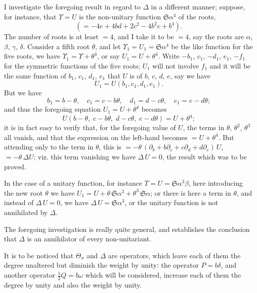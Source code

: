\documentclass[11pt,a4paper]{book}
\begin{document}
{{{\setcounter{art}{23}
\begin{art}
I investigate the foregoing result in regard to $\Delta$ in a different manner; suppose, for instance, that $\Upsilon = U$ is the non-unitary function $\mathfrak{S}\alpha^{4}$ of the roots,
\[
(= -4e + 4bd + 2c^{2} - 4b^{2}c + b^{4}).
\]
The number of roots is at least $= 4$, and I take it to be $= 4$, say the roots are $\alpha$, $\beta$, $\gamma$, $\delta$. Consider a fifth root $\theta$, and let $\Upsilon_{1} = U_{1} = \mathfrak{S}\alpha^{4}$ be the like function for the five roots, we have $\Upsilon_{1} = \Upsilon + \theta^{4}$, or say $U_{1} = U + \theta^{4}$. Write $-b_{1}$, $c_{1}$, $-d_{1}$, $e_{1}$, $-f_{1}$ for the symmetric functions of the five roots; $U_{1}$ will not involve $f_{1}$ and it will be the same function of $b_{1}$, $c_{1}$, $d_{1}$, $e_{1}$ that $U$ is of $b$, $c$, $d$, $e$, say we have
\[
U_{1} = U(b_{1}, c_{1}, d_{1}, e_{1}).
\]
But we have
\[
b_{1} = b - \theta,\quad c_{1} = c - b\theta,\quad d_{1} = d - c\theta,\quad e_{1} = e - d\theta;
\]
and thus the foregoing equation $U_{1} = U + \theta^{4}$ becomes
\[
U(b - \theta,\; c - b\theta,\; d - c\theta,\; e - d\theta) = U + \theta^{4};
\]
it is in fact easy to verify that, for the foregoing value of $U$, the terms in $\theta$, $\theta^{2}$, $\theta^{3}$ all vanish, and that the expression on the left-hand becomes $= U + \theta^{4}$. But attending only to the term in $\theta$, this is $= -\theta\,(\partial_{b} + b\partial_{c} + c\partial_{d} + d\partial_{e})\,U$, $= -\theta\,\Delta U$; viz. this term vanishing we have $\Delta\,U = 0$, the result which was to be proved.

In the case of a unitary function, for instance $T = U = \mathfrak{S}\alpha^{3}\beta$, here introducing the new root $\theta$ we have $U_{1} = U + \theta\,\mathfrak{S}\alpha^{3} + \theta^{3}\,\mathfrak{S}\alpha$; or there is here a term in $\theta$, and instead of $\Delta\,U = 0$, we have $\Delta\,U = \mathfrak{S}\alpha^{3}$, or the unitary function is not annihilated by $\Delta$.

The foregoing investigation is really quite general, and establishes the conclusion that $\Delta$ is an annihilator of every non-unitariant.

It is to be noticed that $\Theta_{\sigma}$ and $\Delta$ are operators, which leave each of them the degree unaltered but diminish the weight by unity: the operator $P = b\delta$, and another operator $\frac{1}{2}Q = b\omega$ which will be considered, increase each of them the degree by unity and also the weight by unity.
\end{art}

}}}
\end{document}
